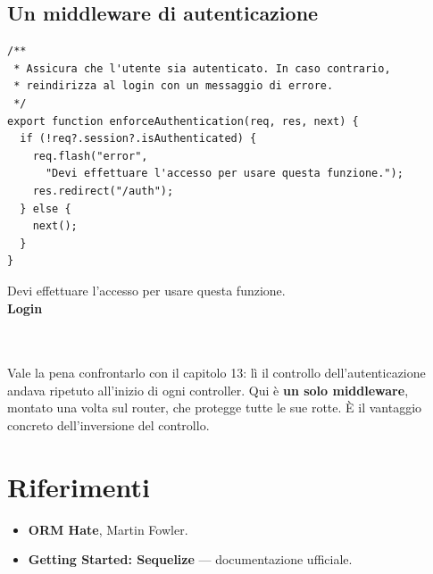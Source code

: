 \subsection{Un middleware di autenticazione}

\begin{affianco}[0.6][c]
\codicepiccolo
\begin{lstlisting}[style=js, name=middleware/auth.js]
/**
 * Assicura che l'utente sia autenticato. In caso contrario,
 * reindirizza al login con un messaggio di errore.
 */
export function enforceAuthentication(req, res, next) {
  if (!req?.session?.isAuthenticated) {
    req.flash("error",
      "Devi effettuare l'accesso per usare questa funzione.");
    res.redirect("/auth");
  } else {
    next();
  }
}
\end{lstlisting}
\risultato
\begin{browser}
  {\color{css-crimson}\small Devi effettuare l'accesso per usare questa funzione.}\\[4pt]
  {\Lora\bfseries\LARGE Login}\\[4pt]
  \wtcampo[3.0cm]{}\\[3pt]
  \wtcampo[3.0cm]{}\\[4pt]
\end{browser}
\end{affianco}

Vale la pena confrontarlo con il capitolo 13: lì il controllo
dell'autenticazione andava ripetuto all'inizio di ogni controller. Qui è
\textbf{un solo middleware}, montato una volta sul router, che protegge tutte le
sue rotte. È il vantaggio concreto dell'inversione del controllo.

\section{Riferimenti}

\begin{itemize}
  \item \textbf{ORM Hate}, Martin Fowler. \\
  \item \textbf{Getting Started: Sequelize} --- documentazione ufficiale. \\
\end{itemize}
